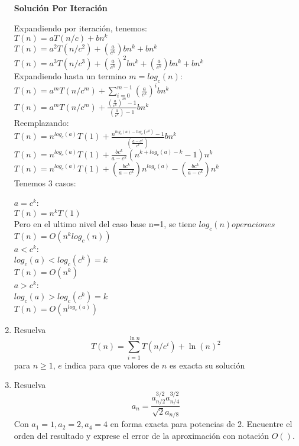 \documentclass{article}
\begin{document}
\begin{enumerate}[label=\textbf{\alph*.}]
    \textbf{Soluci\'on Por Iteración}
    
    Expandiendo por iteración, tenemos:\\
    $T(n)=aT(n/c)+bn^k$\\
    $T(n)=a^2T(n/c^2) + (\frac{a}{c^k})b n^k +bn^k$\\
    $T(n)=a^3T(n/c^3) + (\frac{a}{c^k})^2b n^k + (\frac{a}{c^k})b n^k +bn^k$\\
    Expandiendo hasta un termino $m=log_c(n)$:\\
    $T(n)=a^mT(n/c^m) + \sum_{i=0}^{m-1} (\frac{a}{c^k})^i b n^k $\\
    $T(n)=a^mT(n/c^m) + \frac{(\frac{a}{c^k})^m -1}{(\frac{a}{c^k})-1} bn^k$\\
    Reemplazando:\\
    $T(n)=n^{log_c(a)}T(1) + \frac{n^{log_c(a)-log_c(c^k)} -1}{(\frac{a-c^k}{c^k})} bn^k$\\
    $T(n)=n^{log_c(a)}T(1) + \frac{bc^k}{a-c^k}(n^{k+log_c(a)-k} -1)n^k$\\
    $T(n)=n^{log_c(a)}T(1) + (\frac{bc^k}{a-c^k})n^{log_c(a)} - (\frac{bc^k}{a-c^k})n^k$\\
    
    Tenemos 3 casos:
    
    $a=c^k$:\\
    $T(n)=n^{k}T(1)$\\
    Pero en el ultimo nivel del caso base n=1, se tiene $log_c(n) operaciones$\\
    $T(n)=O(n^{k}log_c(n))$\\
    
    $a<c^k$:\\
    $log_c(a) < log_c(c^k)=k$\\
    $T(n)=O(n^k)$\\
    
    $a>c^k$:\\
    $log_c(a) > log_c(c^k)=k$\\
    $T(n)=O(n^{log_c(a)})$\\

  \item Resuelva
  $$ T(n)=\sum^{\ln{n}}_{i=1}T(n/e^i)+\ln(n)^2$$
  para $n\geq 1$, $e$ indica para que valores de $n$ es exacta su solución

  \item Resuelva
  $$ a_n= \frac{a^{3/2}_{n/2}a^{3/2}_{n/4}}{\sqrt{2}a_{n/8}}$$
  Con $a_1=1, a_2=2, a_4=4$ en forma exacta para potencias de 2. Encuentre el orden del resultado y exprese el error de la aproximación con notación $O()$.


\end{enumerate}
\end{document}
